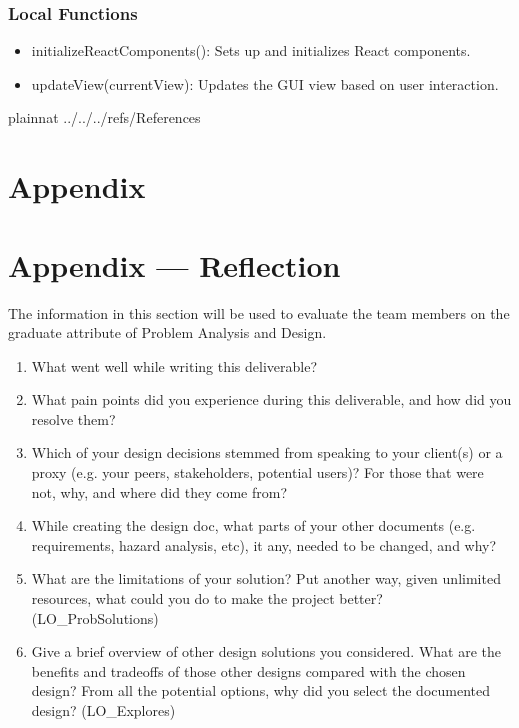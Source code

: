\documentclass[12pt, titlepage]{article}
\begin{document}
\subsubsection{Local Functions}

\begin{itemize}
  \item initializeReactComponents(): Sets up and initializes React components.
  \item updateView(currentView): Updates the GUI view based on user interaction.
\end{itemize}

\newpage

 {plainnat}
 {../../../refs/References}

\newpage

\section{Appendix} \label{Appendix}


\newpage{}

\section*{Appendix --- Reflection}


The information in this section will be used to evaluate the team members on the
graduate attribute of Problem Analysis and Design.

% 

\begin{enumerate}
  \item What went well while writing this deliverable? 
  \item What pain points did you experience during this deliverable, and how
    did you resolve them?
  \item Which of your design decisions stemmed from speaking to your client(s)
  or a proxy (e.g. your peers, stakeholders, potential users)? For those that
  were not, why, and where did they come from?
  \item While creating the design doc, what parts of your other documents (e.g.
  requirements, hazard analysis, etc), it any, needed to be changed, and why?
  \item What are the limitations of your solution?  Put another way, given
  unlimited resources, what could you do to make the project better? (LO\_ProbSolutions)
  \item Give a brief overview of other design solutions you considered.  What
  are the benefits and tradeoffs of those other designs compared with the chosen
  design?  From all the potential options, why did you select the documented design?
  (LO\_Explores)
\end{enumerate}
\end{document}
